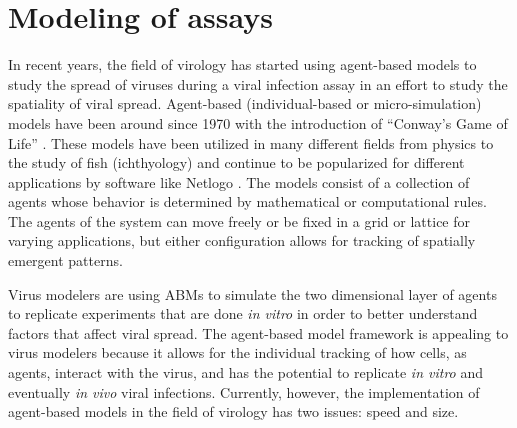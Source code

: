 \section{Modeling of assays}

In recent years, the field of virology has started using agent-based models to study the spread of viruses during a viral infection assay \citep{beauchemin_simple_2005,alvarado_cellular-level_2018,wodarz_laws_2014,tong_development_2015,whitman20,goyal16,itakura10,wasik14} in an effort to study the spatiality of viral spread. Agent-based (individual-based or micro-simulation) models have been around since 1970 with the introduction of ``Conway's Game of Life'' \citep{gardner70}. These models have been utilized in many different fields from physics to the study of fish (ichthyology) \citep{owusu20} and continue to be popularized for different applications by software like Netlogo \citep{nogare20,chiacchio14}. The models consist of a collection of agents whose behavior is determined by mathematical or computational rules. The agents of the system can move freely \citep{beauchemin07} or be fixed in a grid or lattice \citep{beauchemin_simple_2005} for varying applications, but either configuration allows for tracking of spatially emergent patterns. 

Virus modelers are using ABMs to simulate the two dimensional layer of agents to replicate experiments that are done \emph{in vitro} in order to better understand factors that affect viral spread. The agent-based model framework is appealing to virus modelers because it allows for the individual tracking of how cells, as agents, interact with the virus, and has the potential to replicate \emph{in vitro} and eventually \emph{in vivo} viral infections. Currently, however, the implementation of agent-based models in the field of virology has two issues: speed and size. 

